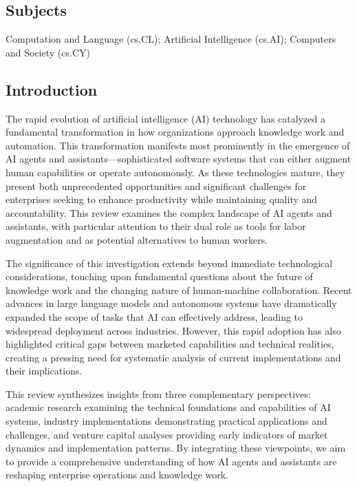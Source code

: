 \documentclass[
]{article}
\begin{document}
\subsection{Subjects}\label{subjects}

Computation and Language (cs.CL); Artificial Intelligence (cs.AI);
Computers and Society (cs.CY)

\subsection{Introduction}\label{introduction}

The rapid evolution of artificial intelligence (AI) technology has
catalyzed a fundamental transformation in how organizations approach
knowledge work and automation. This transformation manifests most
prominently in the emergence of AI agents and assistants---sophisticated
software systems that can either augment human capabilities or operate
autonomously. As these technologies mature, they present both
unprecedented opportunities and significant challenges for enterprises
seeking to enhance productivity while maintaining quality and
accountability. This review examines the complex landscape of AI agents
and assistants, with particular attention to their dual role as tools
for labor augmentation and as potential alternatives to human workers.

The significance of this investigation extends beyond immediate
technological considerations, touching upon fundamental questions about
the future of knowledge work and the changing nature of human-machine
collaboration. Recent advances in large language models and autonomous
systems have dramatically expanded the scope of tasks that AI can
effectively address, leading to widespread deployment across industries.
However, this rapid adoption has also highlighted critical gaps between
marketed capabilities and technical realities, creating a pressing need
for systematic analysis of current implementations and their
implications.

This review synthesizes insights from three complementary perspectives:
academic research examining the technical foundations and capabilities
of AI systems, industry implementations demonstrating practical
applications and challenges, and venture capital analyses providing
early indicators of market dynamics and implementation patterns. By
integrating these viewpoints, we aim to provide a comprehensive
understanding of how AI agents and assistants are reshaping enterprise
operations and knowledge work.
\end{document}
